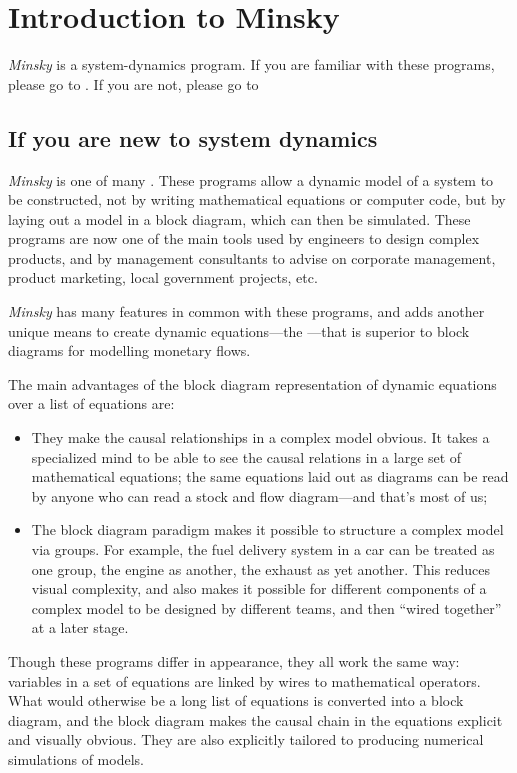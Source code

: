 
\chapter{Introduction to Minsky}

\label{Introduction-Minsky}

\emph{Minsky} is a system-dynamics program. If you are familiar with
these programs, please go to .
If you are not, please go to 

\section{If you are new to system dynamics}

\label{intro:new-system-dynamics}

\emph{Minsky} is one of many .
These programs allow a dynamic model of a system to be constructed,
not by writing mathematical equations or computer code, but by laying
out a model in a block diagram, which can then be simulated. These
programs are now one of the main tools used by engineers to design
complex products, and by management consultants to advise on corporate
management, product marketing, local government projects, etc.

\emph{Minsky} has many features in common with these programs, and
adds another unique means to create dynamic equations---the
---that is superior to block
diagrams for modelling monetary flows.

The main advantages of the block diagram representation of dynamic
equations over a list of equations are:
\begin{itemize}
\item They make the causal relationships in a complex model obvious. It
takes a specialized mind to be able to see the causal relations in
a large set of mathematical equations; the same equations laid out
as diagrams can be read by anyone who can read a stock and flow diagram---and
that's most of us; 
\item The block diagram paradigm makes it possible to structure a complex
model via groups. For example, the fuel delivery system in a car can
be treated as one group, the engine as another, the exhaust as yet
another. This reduces visual complexity, and also makes it possible
for different components of a complex model to be designed by different
teams, and then ``wired together'' at a later stage.
\end{itemize}
Though these programs differ in appearance, they all work the same
way: variables in a set of equations are linked by wires to mathematical
operators. What would otherwise be a long list of equations is converted
into a block diagram, and the block diagram makes the causal chain
in the equations explicit and visually obvious. They are also explicitly
tailored to producing numerical simulations of models.

